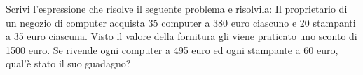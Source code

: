 \item Scrivi l'espressione che risolve il seguente problema e risolvila: Il proprietario di un negozio di computer acquista 35 computer a 380 euro ciascuno e 20 stampanti a 35 euro ciascuna. Visto il valore della fornitura gli viene praticato uno sconto di 1500 euro. Se rivende ogni computer a 495 euro ed ogni stampante a 60 euro, qual'è stato il suo guadagno?